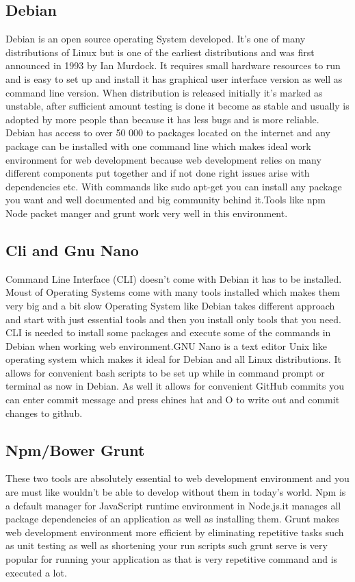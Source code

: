 \begin{itemize}
\subsection{Debian}
\bigbreak
Debian is an open source operating System developed. It’s one of many distributions of Linux but is one of the earliest distributions and was first announced in 1993 by Ian Murdock. It requires small hardware resources to run and is easy to set up and install it has graphical user interface version as well as command line version. When distribution is released initially it’s marked as unstable, after sufficient amount testing is done it become as stable and usually is adopted by more people than because it has less bugs and is more reliable. Debian has access to over 50 000 to packages located on the internet and any package can be installed with one command line which makes ideal work environment for web development because web development relies on many different components put together and if not done right issues arise with dependencies etc. With commands like sudo apt-get you can install any package you want and well documented and big community behind it.Tools like npm Node packet manger and grunt work very well in this environment.
\pagebreak
\subsection{Cli and Gnu Nano}
\bigbreak
Command Line Interface (CLI) doesn’t come with Debian it has to be installed. Moust of Operating Systems come with many tools installed which makes them very big and a bit slow Operating System like Debian takes different approach and start with just essential tools and then you install only tools that you need. CLI is needed to install some packages and execute some of the commands in Debian when working web environment.GNU Nano is a text editor Unix like operating system which makes it ideal for Debian and all Linux distributions. It allows for convenient bash scripts to be set up while in command prompt or terminal as now in Debian. As well it allows for convenient GitHub commits you can enter commit message and press chines hat and O to write out and commit changes to github.


\subsection{Npm/Bower Grunt}
\bigbreak
These two tools are absolutely essential to web development environment and you are must like wouldn’t be able to develop without them in today’s world. Npm is a default manager for JavaScript runtime environment in Node.js.it manages all package dependencies of an application as well as installing them. Grunt makes web development environment more efficient by eliminating repetitive tasks such as unit testing as well as shortening your run scripts such grunt serve is very popular for running your application as that is very repetitive command and is executed a lot.



\end{itemize}
